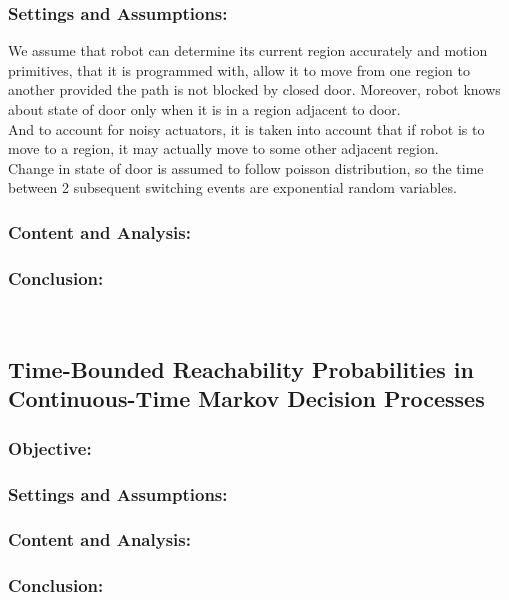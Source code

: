 \documentclass{article}
\theoremstyle{definition}
\begin{document}
\subsubsection{Settings and Assumptions:}
We assume that robot can determine its current region accurately and motion primitives, that it is programmed with, allow it to move from one region to another provided the path is not blocked by closed door. Moreover, robot knows about state of door only when it is in a region adjacent to door.\\
And to account for noisy actuators, it is taken into account that if robot is to move to a region, it may actually move to some other adjacent region.\\
Change in state of door is assumed to follow poisson distribution, so the time between 2 subsequent switching events are exponential random variables.


\subsubsection{Content and Analysis:}

\subsubsection{Conclusion:}


\\
\subsection{Time-Bounded Reachability Probabilities in Continuous-Time Markov Decision Processes}
\subsubsection{Objective:}

\subsubsection{Settings and Assumptions:}

\subsubsection{Content and Analysis:}

\subsubsection{Conclusion:}
\end{document}
